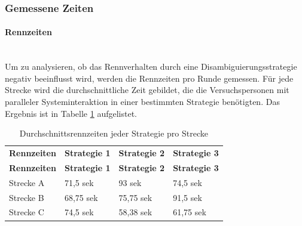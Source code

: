 \documentclass[12pt,a4paper]{scrartcl}
\begin{document}
\subsubsection{Gemessene Zeiten}
\label{messwerte1}
\paragraph{Rennzeiten} 
~\\
Um zu analysieren, ob das Rennverhalten durch eine Disambiguierungsstrategie negativ beeinflusst wird, werden die Rennzeiten pro Runde gemessen. Für jede Strecke wird die durchschnittliche Zeit gebildet, die die Versuchspersonen mit paralleler Systeminteraktion in einer bestimmten Strategie benötigten. Das Ergebnis ist in Tabelle \ref{RZ3SV1} aufgelistet.

\begin{longtable}{p{3cm}p{3cm}p{3cm}p{3cm} }
	\label{RZ3SV1}\\
	\caption[Durchschnittsrennzeiten jeder Strategie pro Strecke]{Durchschnittsrennzeiten jeder Strategie pro Strecke}\\
	\hline
	\textbf{Rennzeiten}&\textbf{Strategie 1}&\textbf{Strategie 2} &\textbf{Strategie 3}\\
	\hline
	\endfirsthead
	\hline
	\textbf{Rennzeiten}&\textbf{Strategie 1}&\textbf{Strategie 2} &\textbf{Strategie 3}\\
	\hline
	\endhead
Strecke A & 71,5 sek & 93 sek & 74,5 sek \\
Strecke B & 68,75 sek & 75,75 sek & 91,5 sek \\
Strecke C & 74,5 sek & 58,38 sek & 61,75 sek \\
\hline
\end{longtable}
\end{document}
